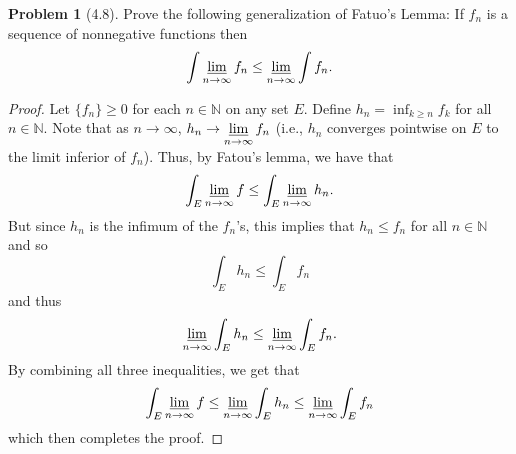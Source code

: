 \documentclass[12pt]{article}
\newcommand{\N}{\mathbb{N}}
\theoremstyle{definition}
\newtheorem{problem}{Problem}
\begin{document}
\begin{problem}[4.8]

    Prove the following generalization of Fatuo's Lemma: If \( {f_n}\) is a sequence of nonnegative functions then 
        \[
            \int \varliminf_{n \to \infty} f_n \leq \varliminf_{n \to \infty} \int f_n.  
        \]

        \begin{proof}
            Let \( \{ f_n\} \geq 0 \) for each \( n \in \N \) on any set \( E \).
            Define \( \displaystyle h_n = \inf_{k \geq n} f_k \) for all \( n \in \N \). Note that as \( n \to \infty\), \( \displaystyle h_n \to \varliminf_{n \to \infty} f_n \) (i.e., \( h_n\) converges pointwise on \( E \) to the limit inferior of \( f_n\)). Thus, by Fatou's lemma, we have that
                \[
                    \int_{E} \varliminf_{n \to \infty} f \leq \int_{E} \varliminf_{n \to \infty} h_n.    
                \]
            But since \( h_n \) is the infimum of the \( f_n \)'s, this implies that \( h_n  \leq f_n \) for all \( n \in \N \) and so
                \[
                  \int_{E} h_n \leq \int_{E} f_n 
                \]
            and thus
                \[
                    \varliminf_{n \to \infty} \int_{E} h_n \leq \varliminf_{n \to \infty} \int_{E} f_n. 
                \]
            By combining all three inequalities, we get that
                \[
                    \int_{E} \varliminf_{n \to \infty} f \leq \varliminf_{n \to \infty} \int_{E} h_n \leq \varliminf_{n \to \infty} \int_{E} f_n
                \]
            which then completes the proof.           
        \end{proof}
    
\end{problem}
\end{document}
